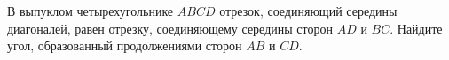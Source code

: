 \begin{ex}
	\begin{condition}
		В выпуклом четырехугольнике \( ABCD  \) отрезок, соединяющий середины диагоналей, равен отрезку, соединяющему середины сторон \( AD  \) и \( BC \). Найдите угол, образованный продолжениями сторон \( AB  \) и \( CD \).
	\end{condition}
	\answer{\( 90\degree \)}
\end{ex}